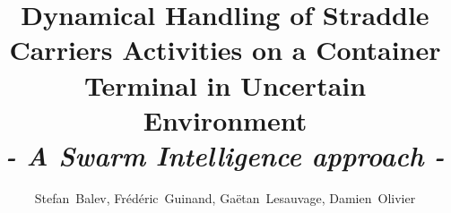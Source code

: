 \documentclass[a4paper,10pt]{article}
\begin{document}
%
\title{Dynamical Handling of Straddle Carriers Activities on a Container Terminal in Uncertain Environment \\ \textit{- A Swarm Intelligence approach -}}
%
%
%

\author{Stefan~Balev, Fr\'{e}d\'{e}ric~Guinand, Ga\"{e}tan~Lesauvage, Damien~Olivier
}

%
%



%
\end{document}
